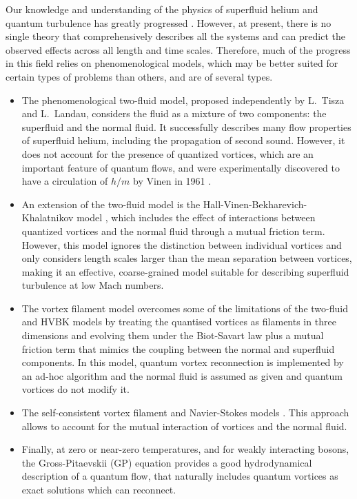 \documentclass[sn-mathphys]{sn-jnl}%
\begin{document}
Our knowledge and understanding of the physics of superfluid helium and quantum turbulence has greatly progressed \cite{Vinen2002}. However, at present, there is no single theory that comprehensively describes all the systems and can predict the observed effects across all length and time scales. Therefore, much of the progress in this field relies on phenomenological models, which may be better suited for certain types of problems than others, and are of several types.
\begin{itemize}
\item The phenomenological two-fluid model, proposed independently by L.~Tisza and L.~Landau, considers the fluid as a mixture of two components: the superfluid and the normal fluid. It successfully describes many flow properties of superfluid helium, including the propagation of second sound. However, it does not account for the presence of quantized vortices, which are an important feature of quantum flows, and were experimentally discovered to have a circulation of $h/m$ by Vinen in 1961 \cite{Vinen1961}.
%
\item An extension of the two-fluid model is the Hall-Vinen-Bekharevich-Khalatnikov model \cite{HallVinen1_1956,HallVinen2_1956,Bekarevich61}, which includes the effect of interactions between quantized vortices and the normal fluid through a mutual friction term. However, this model ignores the distinction between individual vortices and only considers length scales larger than the mean separation between vortices, making it an effective, coarse-grained model suitable for describing superfluid turbulence at low Mach numbers.
%
\item The vortex filament model \cite{Schwarz_85,Schwarz_88} overcomes some of the limitations of the two-fluid and HVBK models by treating the quantised vortices as filaments in three dimensions and evolving them under the Biot-Savart law plus a mutual friction term that mimics the coupling between the normal and superfluid components. In this model, quantum vortex reconnection is implemented by an ad-hoc algorithm and the normal fluid is assumed as given and quantum vortices do not modify it.
%
\item The self-consistent vortex filament and Navier-Stokes models \cite{Kivotides_TripleVortexRing_2000a,Yui_ThreeDimensionalCoupledDynamics_2018,Galantucci_FrictionenhancedLifetimeBundled_2023,Galantucci_NewSelfconsistentApproach_2020}. This approach allows to account for the mutual interaction of vortices and the normal fluid.
%
\item Finally, at zero or near-zero temperatures, and for weakly interacting
bosons, the Gross-Pitaevskii (GP) equation provides a good hydrodynamical description of a quantum
flow, that naturally includes quantum vortices as exact solutions which
can reconnect.
\end{itemize}
\end{document}
